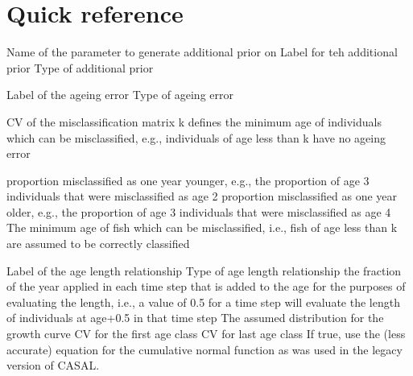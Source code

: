 \section{Quick reference\label{sec:quick-reference}}
\par
{} {Name of the parameter to generate additional prior on}
 {Label for teh additional prior}
 {Type of additional prior}
\par\par
{} {Label of the ageing error}
 {Type of ageing error}
\par\textbf{}\par
\par\textbf{}\par
\par\textbf{}\par
{} {CV of the misclassification matrix}
 {k defines the minimum age of individuals which can be misclassified, e.g., individuals of age less than k have no ageing error}
\par\textbf{}\par
{} {proportion misclassified as one year younger, e.g., the proportion of age 3 individuals that were misclassified as age 2}
 {proportion misclassified as one year older, e.g., the proportion of age 3 individuals that were misclassified as age 4}
 {The minimum age of fish which can be misclassified, i.e., fish of age less than k are assumed to be correctly classified}
\par\par
{} {Label of the age length relationship}
 {Type of age length relationship}
 {the fraction of the year applied in each time step that is added to the age for the purposes of evaluating the length, i.e., a value of 0.5 for a time step will evaluate the length of individuals at age+0.5 in that time step}
 {The assumed distribution for the growth curve}
 {CV for the first age class}
 {CV for last age class}
 {If true, use the (less accurate) equation for the cumulative normal function as was used in the legacy version of CASAL.}
